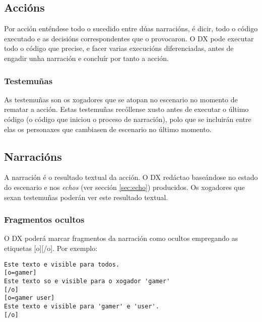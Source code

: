 \subsection{Accións}
Por acción enténdese todo o sucedido entre dúas narracións, é dicir, todo o
código executado e as decisións correspondentes que o provocaron. O DX pode
executar todo o código que precise, e facer varias execucións diferenciadas,
antes de engadir unha narración e concluír por tanto a acción.
\subsubsection{Testemuñas}
As testemuñas son os xogadores que se atopan no escenario no momento de rematar
a acción. Estas testemuñas recóllense xusto antes de executar o último código (o
código que iniciou o proceso de narración), polo que se incluirán entre elas os
personaxes que cambiasen de escenario no último momento.

\subsection{Narracións}
A narración é o resultado textual da acción. O DX redáctao baseándose no estado
do escenario e nos {\it echos} (ver sección \ref{sec:echo}) producidos. Os
xogadores que sexan testemuñas poderán ver este resultado textual.
\subsubsection{Fragmentos ocultos}
O DX poderá marcar fragmentos da narración como ocultos empregando as etiquetas
[o][/o]. Por exemplo:
\begin{lstlisting}
Este texto e visible para todos.
[o=gamer]
Este texto so e visible para o xogador 'gamer'
[/o]
[o=gamer user]
Este texto e visible para 'gamer' e 'user'.
[/o]
\end{lstlisting}





